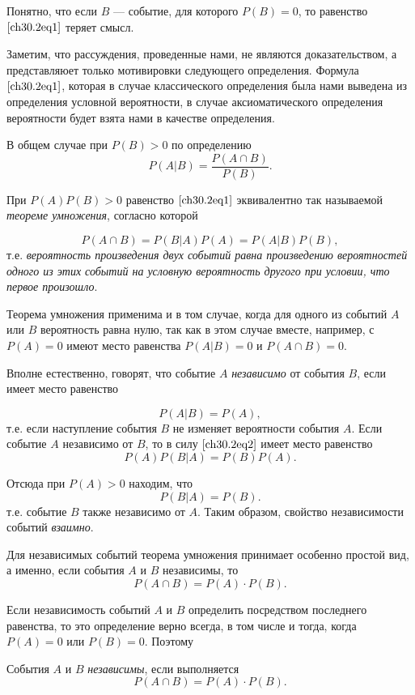 Понятно, что если $B$ --- событие, для которого $P(B)=0$, то равенство~$\eqref{ch30.2eq1}$ теряет смысл.

Заметим, что рассуждения, проведенные нами, не являются доказательством, а представляюет только мотивировки следующего определения.
Формула $\eqref{ch30.2eq1}$, которая в случае классического определения была нами выведена из определения условной вероятности, в случае аксиоматического определения вероятности будет взята нами в качестве определения. 
\begin{defn} В общем случае при $P(B) > 0$ по определению
$$
P(A|B) = \frac{P(A\cap B)}{P(B)}.
$$
\end{defn}

При $P(A)P(B) > 0$ равенство $\eqref{ch30.2eq1}$ эквивалентно так называемой \textit{теореме умножения}, согласно которой

\begin{equation} \label{ch30.2eq2}
P(A\cap B) = P(B|A)P(A) = P(A|B)P(B),
\end{equation}
т.е. \textit{вероятность произведения двух событий равна произведению вероятностей одного из этих событий на условную вероятность другого при условии, что первое произошло}.

Теорема умножения применима и в том случае, когда для одного из событий $A$ или $B$ вероятность равна нулю, так как в этом случае вместе, например, с $P(A) = 0$ имеют место равенства $P(A|B) = 0$ и $P(A\cap B) = 0$.

Вполне естественно, говорят, что событие $A$ \textit{независимо} от события $B$, если имеет место равенство

\begin{equation} \label{ch30.2eq3}
P(A|B) = P(A),
\end{equation}
т.е. если наступление события $B$ не изменяет вероятности события $A$. Если событие $A$ независимо от $B$, то в силу $\eqref{ch30.2eq2}$ имеет место равенство
$$
P(A)P(B|A) = P(B)P(A).
$$

Отсюда при $P(A) > 0$ находим, что
\begin{equation} \label{ch30.2eq4}
P(B|A) = P(B).
\end{equation}
т.е. событие $B$ также независимо от $A$. Таким образом, свойство независимости событий \textit{взаимно}.

Для независимых событий теорема умножения принимает особенно простой вид, а именно, если события $A$ и $B$ независимы, то
$$
P(A\cap B) = P(A) \cdot P(B).
$$

Если независимость событий $A$ и $B$ определить посредством последнего равенства, то это определение верно всегда, в том числе и тогда, когда $P(A) = 0$ или $P(B) = 0$. Поэтому
\begin{defn}
События $A$ и $B$ \textit{независимы}, если выполняется $$P(A\cap B) = P(A)\cdot P(B).$$
\end{defn}

